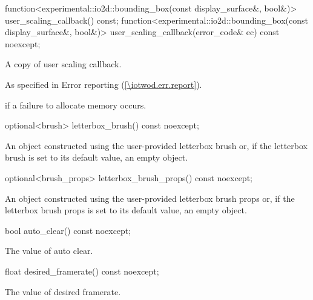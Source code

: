%
\begin{itemdecl}
function<experimental::io2d::bounding_box(const display_surface&, bool&)>
  user_scaling_callback() const;
function<experimental::io2d::bounding_box(const display_surface&, bool&)>
  user_scaling_callback(error_code& ec) const noexcept;
\end{itemdecl}
\begin{itemdescr}
\pnum
\returns
A copy of user scaling callback.

\pnum
\throws
As specified in Error reporting (\ref{\iotwod.err.report}).

\pnum
\errors
{} if a failure to allocate memory occurs.
\end{itemdescr}

%
\begin{itemdecl}
optional<brush> letterbox_brush() const noexcept;
\end{itemdecl}
\begin{itemdescr}
\pnum
\returns
An  object constructed using the user-provided letterbox brush or, if the letterbox brush is set to its default value, an empty  object.
\end{itemdescr}

%
\begin{itemdecl}
optional<brush_props> letterbox_brush_props() const noexcept;
\end{itemdecl}
\begin{itemdescr}
\pnum
\returns
An  object constructed using the user-provided letterbox brush props or, if the letterbox brush props is set to its default value, an empty  object.
\end{itemdescr}

%
\begin{itemdecl}
bool auto_clear() const noexcept;
\end{itemdecl}
\begin{itemdescr}
\pnum
\returns
The value of auto clear.
\end{itemdescr}

%
\begin{itemdecl}
float desired_framerate() const noexcept;
\end{itemdecl}
\begin{itemdescr}
\pnum
\returns
The value of desired framerate.
\end{itemdescr}

